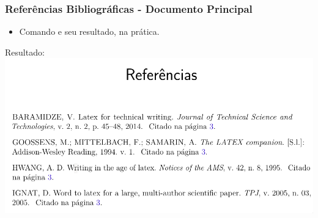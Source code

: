 \documentclass{beamer}
\begin{document}
\begin{frame}[fragile]
  \frametitle{Referências Bibliográficas - Documento Principal}
  \begin{itemize}
  \item Comando \verb__ e seu resultado, na prática.
  \end{itemize}
  \begin{center}
    Resultado:
    \includegraphics[scale=0.30]{../Imagens/A2I121.png}
  \end{center}
\end{frame}





\end{document}
